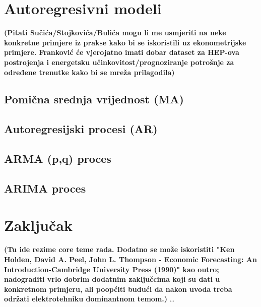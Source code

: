\documentclass[a4paper,12pt,oneside]{memoir}
\begin{document}

    \chapter{Autoregresivni modeli}
        \textbf{(Pitati Sučića/Stojkovića/Bulića mogu li me usmjeriti na neke konkretne primjere iz prakse kako bi se iskoristili uz ekonometrijske primjere. Franković će vjerojatno imati dobar dataset za HEP-ova postrojenja i energetsku učinkovitost/prognoziranje potrošnje za određene trenutke kako bi se mreža prilagodila)}
        \section{Pomična srednja vrijednost (MA)}
        \section{Autoregresijski procesi (AR)}
        \section{ARMA (p,q) proces}
        \section{ARIMA proces}
    \chapter{Zaključak}
        \textbf{(Tu ide rezime core teme rada. Dodatno se može iskoristiti "Ken Holden, David A. Peel, John L. Thompson - Economic Forecasting: An Introduction-Cambridge University Press (1990)" kao outro; nadograditi vrlo dobrim dodatnim zaključcima koji su dati u konkretnom primjeru, ali poopćiti budući da nakon uvoda treba održati elektrotehniku dominantnom temom.)} %
        \ldots{}
\end{document}

